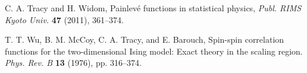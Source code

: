\documentclass[12pt]{article}
\theoremstyle{plain}
\theoremstyle{definition}
\numberwithin{equation}{section}
\begin{document}
\begin{thebibliography}{}
{
C. A. Tracy and H. Widom,
Painlev\'e functions in statistical physics,
\textit{Publ. RIMS Kyoto Univ.} \textbf{47} (2011), 361--374.

T. T. Wu, B. M. McCoy, C. A. Tracy, and E. Barouch,
Spin-spin correlation functions for the two-dimensional Ising model: Exact theory in the scaling region. \textit{Phys. Rev. B} \textbf{13} (1976), pp. 316–374.


}

\end{thebibliography}
\end{document}
